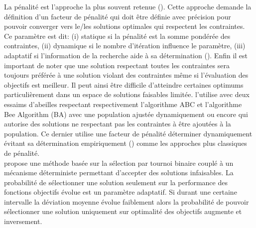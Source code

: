 La pénalité est l’approche la plus souvent retenue (\cite{EfrEnMezura-Montes2003}).
Cette approche demande la définition d’un facteur de pénalité qui doit être définie
avec précision pour pouvoir converger vers le/les solutions optimales qui respectent les
contraintes. Ce paramètre est dit: (i) statique si la pénalité est la somme pondérée des contraintes,
(ii) dynamique si le nombre d’itération influence le paramètre, (iii) adaptatif si l’information de la
recherche aide à sa détermination (\cite{Woldesenbet20073077}).
Enfin il est important de noter que une solution respectant toutes les contraintes sera toujours préférée
à une solution violant des contraintes même si l’évaluation des objectifs est meilleur. Il peut ainsi être
difficile d’atteindre certaines optimums particulièrement
dans un espace de solutions faisables limitée.
\cite{Tsai201480} l’utilise avec deux essaims d’abeilles respectant respectivement l’algorithme
ABC et l’algorithme Bee Algorithm (BA) avec une population ajustée dynamiquement ou encore \cite{Karaboga20113021}
qui autorise des solutions ne respectant pas les contraintes à être ajoutées à la population. Ce dernier
utilise une facteur de pénalité déterminer dynamiquement évitant sa détermination empiriquement
(\cite{Deb2000311}) comme les approches plus classiques de pénalité.
\\

\cite{EfrEnMezura-Montes2003} propose une méthode basée sur la sélection par tournoi binaire couplé à un mécanisme
déterministe permettant d’accepter des solutions infaisables. La probabilité de sélectionner une solution
seulement sur la performance des fonctions objectifs évolue est un paramètre adaptatif. Si durant une
certaine intervalle la déviation moyenne évolue faiblement alors la probabilité de pouvoir sélectionner
une solution uniquement sur optimalité des objectifs augmente et inversement.


